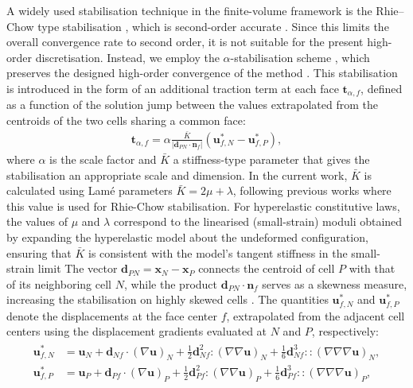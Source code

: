 \documentclass[review,3p]{elsarticle}
\newcommand{\bb}{\boldsymbol}
\begin{document}
A widely used stabilisation technique in the finite-volume framework is the Rhie–Chow type stabilisation \cite{Rhie1983}, which is second-order accurate \cite{Cardiff2025}.
Since this limits the overall convergence rate to second order, it is not suitable for the present high-order discretisation.
Instead, we employ the $\alpha$-stabilisation scheme \cite{Nishikawa2010}, which preserves the designed high-order convergence of the method \cite{Nishikawa2011, Nishikawa2025a}.
This stabilisation is introduced in the form of an additional traction term at each face $\bb{t}_{\alpha, f}$, defined as a function of the solution jump between the values extrapolated from the centroids of the two cells sharing a common face:
\begin{eqnarray}\label{eq:alpha}
	\bb{t}_{\alpha, f} = \alpha \frac{\bar{K}}{|\bb{d}_{PN} \cdot \bb{n}_f|}(\bb{u}_{f,N}^*-\bb{u}_{f,P}^*),
\end{eqnarray}
%
where $\alpha$ is the scale factor and $\bar{K}$ a stiffness-type parameter that gives the stabilisation an appropriate scale and dimension.
In the current work, $\bar{K}$ is calculated using Lamé parameters $\bar{K} = 2\mu +\lambda$, following previous works \cite{Cardiff2017,Cardiff2018,Tukovic2013} where this value is used for Rhie-Chow stabilisation.
For hyperelastic constitutive laws, the values of $\mu$ and $\lambda$ correspond to the linearised (small-strain) moduli obtained by expanding the hyperelastic model about the undeformed configuration, ensuring that $\bar{K}$ is consistent with the model’s tangent stiffness in the small-strain limit
The vector $\bb{d}_{PN}=\bb{x}_N-\bb{x}_P$ connects the centroid of cell $P$ with that of its neighboring cell $N$,
while the product $\bb{d}_{PN} \cdot \bb{n}_f$ serves as a skewness measure, increasing the stabilisation on highly skewed cells \cite{Nishikawa2011}.
The quantities $\bb{u}_{f,N}^*$ and $\bb{u}_{f,P}^*$ denote the displacements at the face center $f$,
extrapolated from the adjacent cell centers using the displacement gradients evaluated at $N$ and $P$, respectively:
\begin{eqnarray}\label{eq:alphaJump}
	\begin{split}
		\bb{u}_{f,N}^* &= \bb{u}_N + \bb{d}_{Nf} \cdot (\nabla \bb{u})_N + \frac{1}{2}\bb{d}_{Nf}^2 \!:\! (\nabla \nabla \bb{u})_N + \frac{1}{6}\bb{d}_{Nf}^3 \!::\! (\nabla \nabla \nabla \bb{u})_N, \\
		\bb{u}_{f,P}^*& = \bb{u}_P + \bb{d}_{Pf} \cdot (\nabla \bb{u})_P + \frac{1}{2}\bb{d}_{Pf}^2 \!:\! (\nabla \nabla \bb{u})_P + \frac{1}{6}\bb{d}_{Pf}^3 \!::\! (\nabla \nabla \nabla \bb{u})_P,
	\end{split}
\end{eqnarray}
\end{document}
